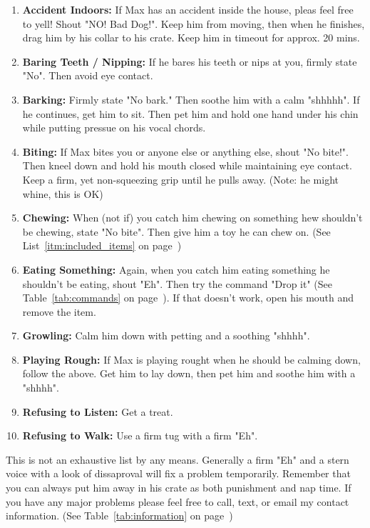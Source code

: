 \documentclass[pdftex,12pt]{article}
\begin{document}
\begin{enumerate}\label{itm:discipline}
    \item \textbf{Accident Indoors:} If Max has an accident inside the house,
        pleas feel free to yell! Shout "NO! Bad Dog!". Keep him from moving,
        then when he finishes, drag him by his collar to his crate. Keep him in
        timeout for approx. 20 mins.
    \item \textbf{Baring Teeth / Nipping:} If he bares his teeth or nips at you,
        firmly state "No". Then avoid eye contact.
    \item \textbf{Barking:} Firmly state "No bark." Then soothe him with a calm
        "shhhhh". If he continues, get him to sit. Then pet him and hold one
        hand under his chin while putting pressue on his vocal chords.
    \item \textbf{Biting:} If Max bites you or anyone else or anything else,
        shout "No bite!". Then kneel down and hold his mouth closed while
        maintaining eye contact. Keep a firm, yet non-squeezing grip until he
        pulls away. (Note: he might whine, this is OK)
    \item \textbf{Chewing:} When (not if) you catch him chewing on something hew
        shouldn't be chewing, state "No bite". Then give him a toy he can chew
        on. (See List~\ref{itm:included_items} on
        page~\pageref{itm:included_items})
    \item \textbf{Eating Something:} Again, when you catch him eating something
        he shouldn't be eating, shout "Eh". Then try the command "Drop it" (See
        Table~\ref{tab:commands} on page~\pageref{tab:commands}). If that
        doesn't work, open his mouth and remove the item.
    \item \textbf{Growling:} Calm him down with petting and a soothing "shhhh".
    \item \textbf{Playing Rough:} If Max is playing rought when he should be
        calming down, follow the above. Get him to lay down, then pet him and
        soothe him with a "shhhh".
    \item \textbf{Refusing to Listen:} Get a treat.
    \item \textbf{Refusing to Walk:} Use a firm tug with a firm "Eh".
\end{enumerate}

This is not an exhaustive list by any means. Generally a firm "Eh" and a stern
voice with a look of dissaproval will fix a problem temporarily. Remember that
you can always put him away in his crate as both punishment and nap time. If you
have any major problems please feel free to call, text, or email my contact
information. (See Table~\ref{tab:information} on page~\pageref{tab:information})


\newpage
\listoftodos
\end{document}
